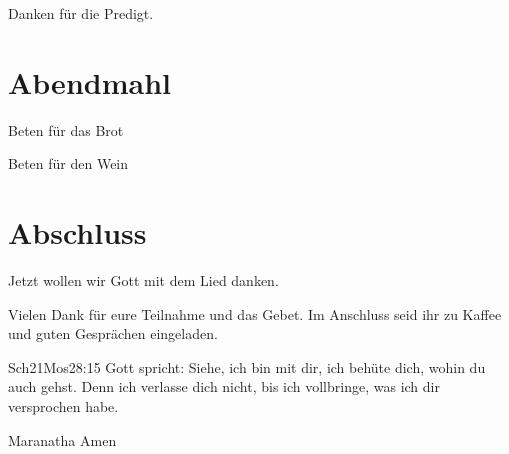 \documentclass{../inc/mybib}
\begin{document}
Danken für die Predigt.

\section{Abendmahl}

Beten für das Brot


Beten für den Wein



\section{Abschluss}

Jetzt wollen wir Gott mit dem Lied  danken.


Vielen Dank für eure Teilnahme und das Gebet. Im Anschluss seid ihr zu Kaffee und guten Gesprächen eingeladen.
\beten{}

\begin{bibeltext}{Sch2}{1Mos}{28:15}
Gott spricht: Siehe, ich bin mit dir,
ich behüte dich, wohin du auch gehst.
Denn ich verlasse dich nicht,
bis ich vollbringe, was ich dir versprochen habe.
\end{bibeltext}

Maranatha Amen
\end{document}
